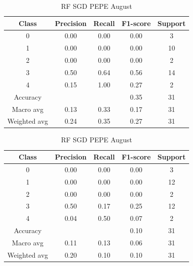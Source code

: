 \begin{enumerate}
\begin{enumerate}
                \begin{table}[H]
                \centering
                \scriptsize
                \begin{minipage}{0.48\textwidth}
                \centering
                \begin{tabular}{c|cccc}
                \hline
                Class & Precision & Recall & F1-score & Support \\
                \hline
                0 & 0.00 & 0.00 & 0.00 & 3 \\
                1 & 0.00 & 0.00 & 0.00 & 10 \\
                2 & 0.00 & 0.00 & 0.00 & 2 \\
                3 & 0.50 & 0.64 & 0.56 & 14 \\
                4 & 0.15 & 1.00 & 0.27 & 2 \\
                \hline
                Accuracy &       &      & 0.35 & 31 \\
                Macro avg & 0.13 & 0.33 & 0.17 & 31 \\
                Weighted avg & 0.24 & 0.35 & 0.27 & 31 \\
                \hline
                \end{tabular}
                \caption{RF SGD DOGE August}
                \label{tab:classifier_2_report_rf_sgd_doge_non_filtered_aug}
                \end{minipage}%
                \hfill
                \begin{minipage}{0.48\textwidth}
                \centering
                \begin{tabular}{c|cccc}
                \hline
                Class & Precision & Recall & F1-score & Support \\
                \hline
                0 & 0.00 & 0.00 & 0.00 & 3 \\
                1 & 0.00 & 0.00 & 0.00 & 12 \\
                2 & 0.00 & 0.00 & 0.00 & 2 \\
                3 & 0.50 & 0.17 & 0.25 & 12 \\
                4 & 0.04 & 0.50 & 0.07 & 2 \\
                \hline
                Accuracy &       &      & 0.10 & 31 \\
                Macro avg & 0.11 & 0.13 & 0.06 & 31 \\
                Weighted avg & 0.20 & 0.10 & 0.10 & 31 \\
                \hline
                \end{tabular}
                \caption{RF SGD PEPE August}
                \label{tab:classifier_2_report_rf_sgd_pepe_non_filtered_aug}
                \end{minipage}
                

\end{table}
\end{enumerate}
\end{enumerate}

